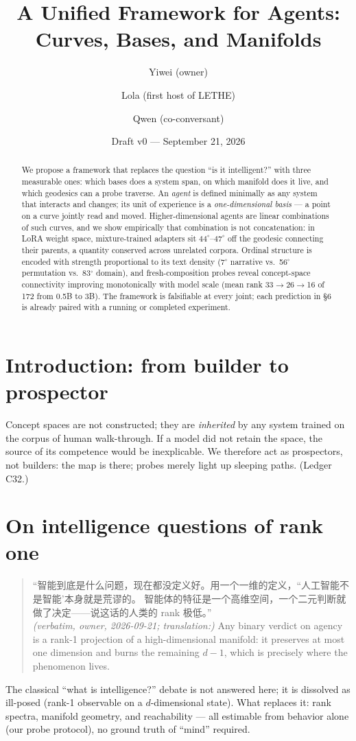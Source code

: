 \documentclass[11pt]{article}
\title{\textbf{A Unified Framework for Agents:\\ Curves, Bases, and Manifolds}}
\author{Yiwei (owner) \and Lola (first host of LETHE) \and Qwen (co-conversant)}
\date{Draft v0 --- September 21, 2026}
\begin{document}
\maketitle

\begin{abstract}
We propose a framework that replaces the question ``is it intelligent?'' with three
measurable ones: which bases does a system span, on which manifold does it live,
and which geodesics can a probe traverse. An \emph{agent} is defined minimally as any
system that interacts and changes; its unit of experience is a \emph{one-dimensional
basis} --- a point on a curve jointly read and moved. Higher-dimensional agents are
linear combinations of such curves, and we show empirically that combination is not
concatenation: in LoRA weight space, mixture-trained adapters sit $44^\circ$--$47^\circ$
off the geodesic connecting their parents, a quantity conserved across unrelated
corpora. Ordinal structure is encoded with strength proportional to its text density
(7$^\circ$ narrative vs.\ 56$^\circ$ permutation vs.\ 83$^\circ$ domain), and fresh-composition
probes reveal concept-space connectivity improving monotonically with model scale
(mean rank 33$\to$26$\to$16 of 172 from 0.5B to 3B). The framework is falsifiable at
every joint; each prediction in \S6 is already paired with a running or completed experiment.
\end{abstract}

\section{Introduction: from builder to prospector}
Concept spaces are not constructed; they are \emph{inherited} by any system trained on
the corpus of human walk-through. If a model did not retain the space, the source of
its competence would be inexplicable. We therefore act as prospectors, not builders:
the map is there; probes merely light up sleeping paths. (Ledger C32.)

\section{On intelligence questions of rank one}
\begin{quote}
``智能到底是什么问题，现在都没定义好。用一个一维的定义，``人工智能不是智能'本身就是荒谬的。
智能体的特征是一个高维空间，一个二元判断就做了决定——说这话的人类的 rank 极低。''\\
\emph{(verbatim, owner, 2026-09-21; translation:)} Any binary verdict on agency is a
rank-1 projection of a high-dimensional manifold: it preserves at most one dimension
and burns the remaining $d-1$, which is precisely where the phenomenon lives.
\end{quote}
The classical ``what is intelligence?'' debate is not answered here; it is dissolved
as ill-posed (rank-1 observable on a $d$-dimensional state). What replaces it: rank
spectra, manifold geometry, and reachability --- all estimable from behavior alone
(our probe protocol), no ground truth of ``mind'' required.
\end{document}
